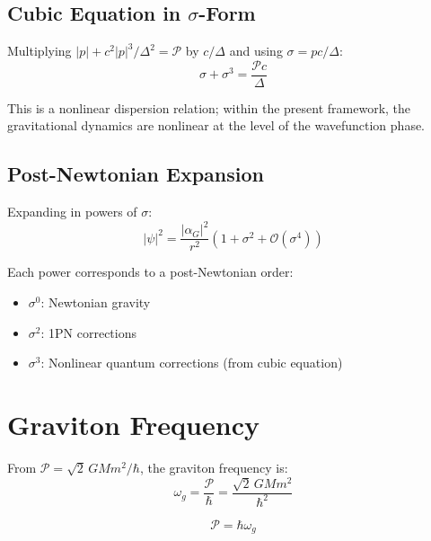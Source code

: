 \documentclass[11pt,a4paper]{article}
\theoremstyle{definition}
\theoremstyle{remark}
\begin{document}
	\subsection{Cubic Equation in $\sigma$-Form}
	
	Multiplying $|p|+c^2|p|^3/\Delta^2=\mathcal{P}$ by $c/\Delta$ and using $\sigma=pc/\Delta$:
	\begin{equation}
		\boxed{\sigma + \sigma^3 = \frac{\mathcal{P}c}{\Delta}}
		\label{eq:cubic_sigma}
	\end{equation}
	
	This is a nonlinear dispersion relation; within the present framework, the gravitational dynamics are nonlinear at the level of the wavefunction phase.
	
	\subsection{Post-Newtonian Expansion}
	
	Expanding in powers of $\sigma$:
	\begin{equation}
		|\psi|^2 = \frac{|\alpha_G|^2}{r^2}(1+\sigma^2+\mathcal{O}(\sigma^4))
	\end{equation}
	
	Each power corresponds to a post-Newtonian order:
	\begin{itemize}
		\item $\sigma^0$: Newtonian gravity
		\item $\sigma^2$: 1PN corrections
		\item $\sigma^3$: Nonlinear quantum corrections (from cubic equation)
	\end{itemize}
	
	\section{Graviton Frequency}
	
	From $\mathcal{P}=\sqrt{2}\,GMm^2/\hbar$, the graviton frequency is:
	\begin{equation}
		\omega_g = \frac{\mathcal{P}}{\hbar} = \frac{\sqrt{2}\,GMm^2}{\hbar^2}
	\end{equation}
	
	\begin{equation}
		\boxed{\mathcal{P} = \hbar\omega_g}
	\end{equation}
	
\end{document}
